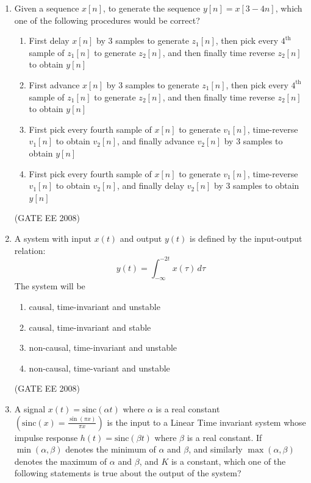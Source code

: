 \documentclass[journal,12pt,onecolumn]{IEEEtran}
\theoremstyle{remark}
\begin{document}
\begin{enumerate}[start=1, label=Q.\arabic*]
\item Given a sequence $x[n]$, to generate the sequence $y[n]=x[3-4n]$, which one of the following procedures would be correct?

\begin{enumerate}
    \item First delay $x[n]$ by 3 samples to generate $z_{1}[n]$, then pick every $4^{\text{th}}$ sample of $z_{1}[n]$ to generate $z_{2}[n]$, and then finally time reverse $z_{2}[n]$ to obtain $y[n]$
    \item First advance $x[n]$ by 3 samples to generate $z_{1}[n]$, then pick every $4^{\text{th}}$ sample of $z_{1}[n]$ to generate $z_{2}[n]$, and then finally time reverse $z_{2}[n]$ to obtain $y[n]$
    \item First pick every fourth sample of $x[n]$ to generate $v_{1}[n]$, time-reverse $v_{1}[n]$ to obtain $v_{2}[n]$, and finally advance $v_{2}[n]$ by 3 samples to obtain $y[n]$
    \item First pick every fourth sample of $x[n]$ to generate $v_{1}[n]$, time-reverse $v_{1}[n]$ to obtain $v_{2}[n]$, and finally delay $v_{2}[n]$ by 3 samples to obtain $y[n]$
\end{enumerate}
\hfill (GATE EE 2008)


\item A system with input $x(t)$ and output $y(t)$ is defined by the input-output relation:
$$
y(t) = \int_{-\infty}^{-2t} x(\tau) \,d\tau
$$
The system will be

\begin{enumerate}
    \item causal, time-invariant and unstable
    \item causal, time-invariant and stable
    \item non-causal, time-invariant and unstable
    \item non-causal, time-variant and unstable
\end{enumerate}
\hfill (GATE EE 2008)


\item A signal $x(t)=\text{sinc}(\alpha t)$ where $\alpha$ is a real constant $\left(\text{sinc}(x) = \frac{\sin(\pi x)}{\pi x}\right)$ is the input to a Linear Time invariant system whose impulse response $h(t)=\text{sinc}(\beta t)$ where $\beta$ is a real constant. If $\min(\alpha, \beta)$ denotes the minimum of $\alpha$ and $\beta$, and similarly $\max(\alpha, \beta)$ denotes the maximum of $\alpha$ and $\beta$, and $K$ is a constant, which one of the following statements is true about the output of the system?


\end{enumerate}
\end{document}

